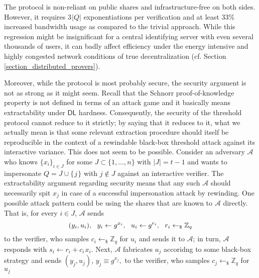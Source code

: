 \documentclass{iacrtrans}
\begin{document}
The protocol is non-reliant on public shares and
infrastructure-free on both sides.
However, it requires
$3\hspace{1pt}|Q|$ exponentiations per verification
and at least $33\%$ increased bandwidth usage
as compared to the trivial approach.
While this regression might be insignificant
for a central identifying server
with even several thousands of users,
it can badly affect efficiency under
the energy intensive and
highly congested network conditions
of true decentralization
(cf. Section \ref{section_distributed_provers}).

Moreover, while the protocol is most probably secure,
the security argument is not as strong
as it might seem. Recall that the Schnorr proof-of-knowledge
property is not defined in terms of an attack game
and it basically means extractability under $\mathsf{DL}$
hardness. Consequently, the security of the threshold protocol
cannot reduce to it strictly;
by saying that it reduces to it,
what we actually mean is that
some relevant extraction procedure
should itself be reproducible in the context of
a rewindable black-box threshold attack
against its interactive variance.
This does not seem to be possible.
Consider an adversary $\mathcal{A}$ who knows
$\{x_i\}_{i \in J}$
for some $J \subset \{1, \dots, n\}$ with $|J| = t - 1$
and wants to impersonate
$Q = J \cup \{\hspace{1pt}j\hspace{1pt}\}$
with $j \not \in J$ against an interactive verifier.
The extractability argument regarding security
means that any such $\mathcal{A}$
should necessarily spit $x_j$ in case of
a successful impersonation attack by rewinding.
One possible attack pattern could
be using the shares that are known to $\mathcal{A}$ directly.
That is, for every $i \in J$,
$\mathcal{A}$ sends
\vspace{5pt}
\begin{equation*}
(y_i, u_i),
\ \ y_i \leftarrow g ^ {x_i},
\ \ u_i \leftarrow g ^ {r_i},
\ \ r_i \leftarrow_\$ \mathbb{Z}_q
\vspace{5pt}
\end{equation*}
to the verifier,
who samples $c_i \leftarrow_\$ \mathbb{Z}_q$
for $u_i$
and sends it to $\mathcal{A}$;
in turn, $\mathcal{A}$ responds
with $s_i \leftarrow r_i + c_i\hspace{1pt}x_i$.
Next, $\mathcal{A}$ fabricates $u_j$
accoridng to some black-box strategy and sends
$(y_j, u_j),\hspace{2pt} y_j \equiv g ^ {x_j},$ to the verifier,
who samples $c_j \leftarrow_\$ \mathbb{Z}_q$ for $u_j$
\end{document}
